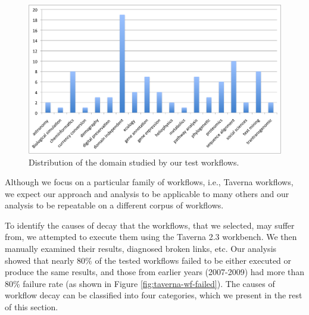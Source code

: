  \begin{figure}[h]
  \begin{center}
    \includegraphics[width=13cm]{./Figures/domain-features.png}
        \caption{Distribution of the domain studied by our test workflows.}
        \label{fig:domain_distribution}
  \end{center}
\end{figure}


Although we focus on a particular family of workflows, i.e., Taverna workflows, we expect our approach and analysis to be applicable to many others and our analysis to be repeatable on a different corpus of workflows. 

To identify the causes of decay that the workflows, that we selected, may suffer from, we attempted to execute them using the Taverna 2.3 workbench. We then manually examined their results, diagnosed broken links, etc. Our analysis showed that nearly $80\%$ of the tested workflows failed to be either executed or produce the same results, and those from earlier years (2007-2009) had more than 80\% failure rate (as shown in Figure \ref{fig:taverna-wf-failed}). The causes of workflow decay can be classified into four categories, which we present in the rest of this section. 


